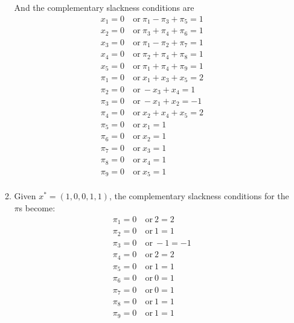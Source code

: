 \documentclass[12pt]{article}
\begin{document}
\begin{enumerate}
\begin{enumerate}
        And the complementary slackness conditions are
        \begin{equation}
          \begin{split}
            x_1=0&\ \text{or}\ \pi_1-\pi_3+\pi_5=1\\
            x_2=0&\ \text{or}\ \pi_3+\pi_4+\pi_6=1\\
            x_3=0&\ \text{or}\ \pi_1-\pi_2+\pi_7=1\\
            x_4=0&\ \text{or}\ \pi_2+\pi_4+\pi_8=1\\
            x_5=0&\ \text{or}\ \pi_1+\pi_4+\pi_9=1\\
            \pi_1=0&\ \text{or}\ x_1+x_3+x_5=2\\
            \pi_2=0&\ \text{or}\ -x_3+x_4=1\\
            \pi_3=0&\ \text{or}\ -x_1+x_2=-1\\
            \pi_4=0&\ \text{or}\ x_2+x_4+x_5=2\\
            \pi_5=0&\ \text{or}\ x_1=1\\
            \pi_6=0&\ \text{or}\ x_2=1\\
            \pi_7=0&\ \text{or}\ x_3=1\\
            \pi_8=0&\ \text{or}\ x_4=1\\
            \pi_9=0&\ \text{or}\ x_5=1\\
          \end{split}
        \end{equation}
      \item
        Given $x^* = (1,0,0,1,1)$, the complementary slackness conditions
        for the $\pi$s become:
        \begin{equation}
          \begin{split}
            \pi_1=0&\ \text{or}\ 2=2\\
            \pi_2=0&\ \text{or}\ 1=1\\
            \pi_3=0&\ \text{or}\ -1=-1\\
            \pi_4=0&\ \text{or}\ 2=2\\
            \pi_5=0&\ \text{or}\ 1=1\\
            \pi_6=0&\ \text{or}\ 0=1\\
            \pi_7=0&\ \text{or}\ 0=1\\
            \pi_8=0&\ \text{or}\ 1=1\\
            \pi_9=0&\ \text{or}\ 1=1\\
          \end{split}
        \end{equation}

\end{enumerate}
\end{enumerate}
\end{document}

